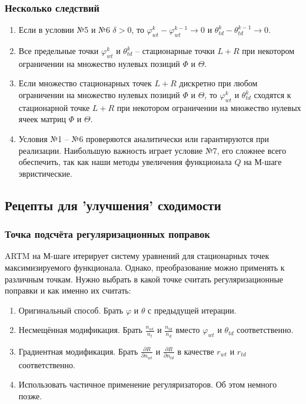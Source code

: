 \documentclass[utf8]{beamer}
\renewcommand{\phi}{\varphi}
\begin{document}
\begin{frame}
\frametitle{Несколько следствий}
\begin{enumerate}
\item  Если в условии №5 и №6 $\delta > 0$, то $\phi^k_{wt} - \phi_{wt}^{k-1} \to 0$ и $\theta^k_{td} - \theta^{k-1}_{td} \to 0$.
\item Все предельные точки $\phi^k_{wt}$ и $\theta^k_{td}$ -- стационарные точки $L + R$ при некотором ограничении на множество нулевых позиций $\Phi$ и $\Theta$.
\item Если множество стационарных точек $L + R$ дискретно при любом ограничении на множество нулевых позиций $\Phi$ и $\Theta$, то $\phi_{wt}^k$ и $\theta_{td}^k$ сходятся к стационарной точке $L+R$ при некотором ограничении  на множество нулевых ячеек матриц $\Phi$ и $\Theta$.
\item Условия №1 -- №6 проверяются аналитически или гарантируются при реализации. Наибольшую важность играет условие №7, его сложнее всего обеспечить, так как наши методы увеличения функционала $Q$ на М-шаге эвристические.
\end{enumerate}
\end{frame}

	
\subsection{Рецепты для 'улучшения' сходимости}

\begin{frame}
\frametitle{Точка подсчёта регуляризационных поправок}
ARTM на М-шаге итерирует систему уравнений для стационарных точек максимизируемого функционала. Однако, преобразование можно применять к различным точкам. Нужно выбрать в какой точке считать регуляризационные поправки и как именно их считать:
\medskip

\begin{enumerate}
\item Оригинальный способ. Брать $\phi$ и $\theta$ с предыдущей итерации.
\item Несмещённая модификация. Брать $\frac{n_{wt}}{n_t}$ и $ \frac{n_{td}}{n_d}$ вместо $\phi_{wt}$ и $\theta_{td}$ соответственно.
\item Градиентная модификация. Брать $\frac{\partial{R}}{\partial{n_{wt}}} $ и $ \frac{\partial{R}}{\partial{n_{td}}}$ в качестве $r_{wt}$ и $r_{td}$ соответственно.
\item Использовать частичное применение регуляризаторов. Об этом немного позже.
\end{enumerate}
\end{frame}
	
\end{document}
